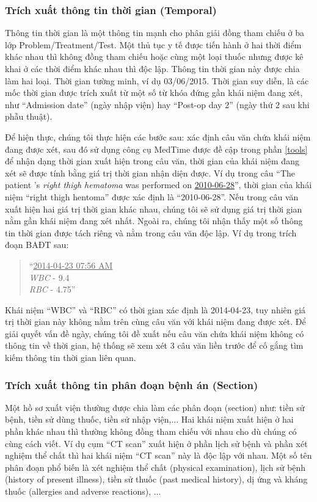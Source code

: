 \subsubsection*{Trích xuất thông tin thời gian (Temporal)}
Thông tin thời gian là một thông tin mạnh cho phân giải đồng tham chiếu ở ba lớp Problem/Treatment/Test. Một thủ tục y tế được tiến hành ở hai thời điểm khác nhau thì không đồng tham chiếu hoặc cùng một loại thuốc nhưng được kê khai ở các thời điểm khác nhau thì độc lập. Thông tin thời gian này được chia làm hai loại. Thời gian tường minh, ví dụ 03/06/2015. Thời gian suy diễn, là các mốc thời gian được trích xuất từ một số từ khóa đứng gần khái niệm đang xét, như ``Admission date'' (ngày nhập viện) hay ``Post-op day 2'' (ngày thứ 2 sau khi phẫu thuật).

Để hiện thực, chúng tôi thực hiện các bước sau: xác định câu văn chứa khái niệm đang được xét, sau đó sử dụng công cụ MedTime được đề cập trong phần \ref{tools} để nhận dạng thời gian xuất hiện trong câu văn, thời gian của khái niệm đang xét sẽ được tính bằng giá trị thời gian nhận diện được. Ví dụ trong câu ``The patient 's \textit{right thigh hematoma} was performed on \underline{2010-06-28}'', thời gian của khái niệm ``right thigh hentoma'' được xác định là ``2010-06-28''. Nếu trong câu văn xuất hiện hai giá trị thời gian khác nhau, chúng tôi sẽ sử dụng giá trị thời gian nằm gần khái niệm đang xét nhất. Ngoài ra, chúng tôi nhận thấy một số thông tin thời gian được tách riêng và nằm trong câu văn độc lập. Ví dụ trong trích đoạn BAĐT sau:

\begin{quote}
``\underline{2014-04-23 07:56 AM}\\
\textit{WBC} - 9.4\\
\textit{RBC} - 4.75''
\end{quote}

Khái niệm ``WBC'' và ``RBC'' có thời gian xác định là 2014-04-23, tuy nhiên giá trị thời gian này không nằm trên cùng câu văn với khái niệm đang được xét. Để giải quyết vấn đề ngày, chúng tôi đề xuất nếu câu văn chứa khái niệm không có thông tin về thời gian, hệ thống sẽ xem xét 3 câu văn liền trước để cố gắng tìm kiếm thông tin thời gian liên quan.

\subsubsection*{Trích xuất thông tin phân đoạn bệnh án (Section)}
Một hồ sơ xuất viện thường được chia làm các phân đoạn (section) như: tiền sử bệnh, tiền sử dùng thuốc, tiền sử nhập viện,... Hai khái niệm xuất hiện ở hai phần khác nhau thì thường không đồng tham chiếu với nhau cho dù chúng có cùng cách viết. Ví dụ cụm “CT scan” xuất hiện ở phần lịch sử bệnh và phần xét nghiệm thể chất thì hai khái niệm “CT scan” này là độc lập với nhau. Một số tên phân đoạn phổ biến là xét nghiệm thể chất (physical examination), lịch sử bệnh (history of present illness), tiền sử thuốc (past medical history), dị ứng và kháng thuốc (allergies and adverse reactions), ...

